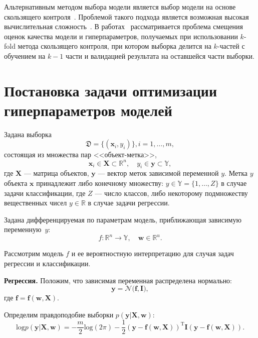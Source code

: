 Альтернативным методом выбора модели является выбор модели на основе скользящего контроля~\cite{cv_ms, tokmakova}. Проблемой такого подхода является возможная высокая вычислительная сложность~\cite{expensive,expensive2}. В работах~\cite{bias,bias2} рассматривается проблема смещения оценок качества модели и гиперпараметров, получаемых при использовании $k$-fold метода скользящего контроля, при котором выборка делится на $k$-частей с обучением на $k-1$ части и валидацией результата на оставшейся части выборки. 




\section{Постановка задачи оптимизации гиперпараметров моделей}
Задана выборка  \begin{equation}\label{eq:dataset}\mathfrak{D} = \{(\mathbf{x}_i,y_i)\}, i = 1,\dots,m,\end{equation} состоящая из множества пар <<объект-метка>>, $$\mathbf{x}_i \in \mathbf{X} \subset \mathbb{R}^n, \quad {y}_i \in \mathbf{y} \subset \mathbb{Y},$$ где $\mathbf{X}$ --- матрица объектов,  $\mathbf{y}$ --- вектор меток зависимой переменной $y$. Метка ${y}$  объекта $\mathbf{x}$ принадлежит либо конечному множеству: ${y} \in \mathbb{Y} = \{1, \dots, Z\}$ в случае задачи классификации, где $Z$ --- число классов, либо некоторому подмножеству вещественных чисел ${y} \in  \mathbb{R}$ в случае задачи регрессии.

Задана дифференцируемая по параметрам модель, приближающая зависимую переменную~$y$:
\[
	f:\mathbb{R}^n \to \mathbb{Y}, \quad \mathbf{w} \in \mathbb{R}^u.
\]

Рассмотрим модель $f$ и ее вероятностную интерпретацию для случая задач регрессии и классификации. 

\textbf{Регрессия. }
Положим, что зависимая переменная распределена нормально:
\begin{equation}
\label{eq:reg}
\mathbf{y} = \mathcal{N}\bigl(\mathbf{f}, \mathbf{I}\bigr),
\end{equation}
где $\mathbf{f} = \mathbf{f}(\mathbf{w}, \mathbf{X})$.

Определим правдоподобие выборки $p(\mathbf{y}|\mathbf{X}, \mathbf{w})$:
\[
	\text{log}p(\mathbf{y}|\mathbf{X}, \mathbf{w}) =-\frac{m}{2}\text{log}(2\pi)   -\frac{1}{2}(\mathbf{y} - \mathbf{f}(\mathbf{w}, \mathbf{X}))^\text{T}\mathbf{I}(\mathbf{y} - \mathbf{f}(\mathbf{w}, \mathbf{X})).
\] 

